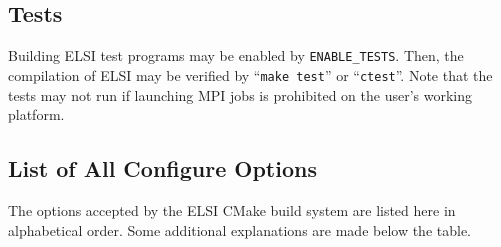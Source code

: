 \documentclass{report}
\begin{document}
\subsection{Tests}
\label{subsec:config_tests}
Building ELSI test programs may be enabled by \texttt{ENABLE\_TESTS}. Then, the compilation of ELSI may be verified by ``\texttt{make test}'' or ``\texttt{ctest}''. Note that the tests may not run if launching MPI jobs is prohibited on the user's working platform.

\subsection{List of All Configure Options}
\label{subsec:config_options} The options accepted by the ELSI CMake build
system are listed here in alphabetical order. Some additional explanations
are made below the table.
\end{document}
